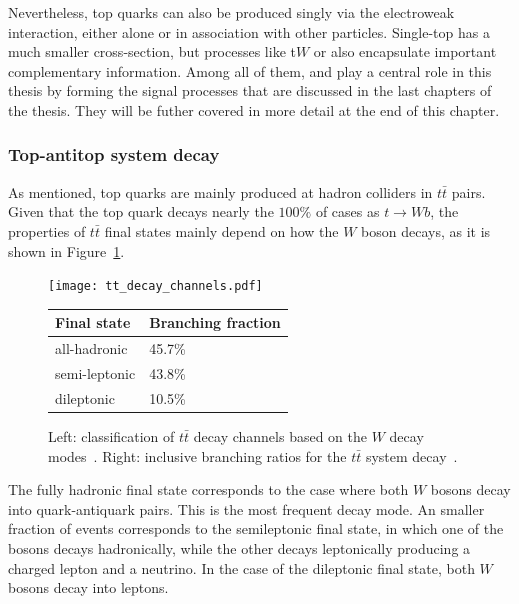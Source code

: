 Nevertheless, top quarks can also be produced singly via the electroweak interaction, either alone or in association with other particles. Single-top has a much smaller cross-section, but processes like t$W$ or \tH also encapsulate important complementary information.
Among all of them, \tH and \ttH play a central role in this thesis by forming the signal processes that are discussed in the last chapters of the thesis. They will be futher covered in more detail at the end of this chapter.

\subsubsection*{Top-antitop system decay}
\label{subsec:top_quark_decay}

As mentioned, top quarks are mainly produced at hadron colliders in $t\bar{t}$ pairs. Given that the top quark decays nearly the $100\%$ of cases as $t\rightarrow Wb$, the properties of $t\bar{t}$ final states mainly depend on how the $W$ boson decays, as it is shown in Figure~\ref{fig:diagram-and-table-top}.
\begin{figure}[htbp]
    \centering
    \begin{minipage}[c]{0.48\textwidth}
        \centering
        \texttt{[image: tt\_decay\_channels.pdf]}
    \end{minipage}
    \hfill
    \begin{minipage}[c]{0.48\textwidth}
        \centering
        \footnotesize
        \begin{tabular}{ll}
            \hline
            \textbf{Final state} & \textbf{Branching fraction} \\ \hline
            all-hadronic         & 45.7\%                     \\
            semi-leptonic        & 43.8\%                     \\
            dileptonic           & 10.5\%                     \\\hline
        \end{tabular}
    \end{minipage}
    \caption{Left: classification of $t\bar{t}$ decay channels based on the $W$ decay modes~\cite{Lannon_2012}. Right: inclusive branching ratios for the $t\bar{t}$ system decay~\cite{ParticleDataGroup}.}
    \label{fig:diagram-and-table-top}
\end{figure}

The fully hadronic final state corresponds to the case where both $W$ bosons decay into quark-antiquark pairs. This is the most frequent decay mode. An smaller fraction of events corresponds to the semileptonic final state, in which one of the bosons decays hadronically, while the other decays leptonically producing a charged lepton and a neutrino. In the case of the dileptonic final state, both $W$ bosons decay into leptons.

